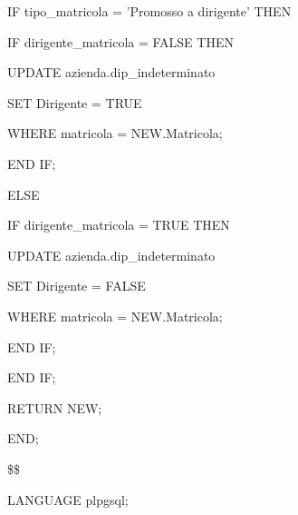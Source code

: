 \begin{flushleft}
\begin{description}
\begin{description}
                        \item IF tipo\_matricola = 'Promosso a dirigente' THEN
                        \begin{description}
                            \item IF dirigente\_matricola = FALSE THEN
                            \begin{description}
                                \item UPDATE azienda.dip\_indeterminato
                                \item SET Dirigente = TRUE
                                \item WHERE matricola = NEW.Matricola;
                            \end{description}
                            \item END IF;
                        \end {description}
                        \item ELSE
                        \begin{description}
                            \item IF dirigente\_matricola = TRUE THEN
                            \begin{description}
                                \item UPDATE azienda.dip\_indeterminato
                                \item SET Dirigente = FALSE
                                \item WHERE matricola = NEW.Matricola;
                            \end{description}
                            \item END IF;
                        \end{description}
                        \item END IF;

                        \item RETURN NEW;
                    \end{description}
                    \item END;
                    \item \$\$
                    \item LANGUAGE plpgsql;
                \end{description}
            \end{flushleft}
        \normalfont

